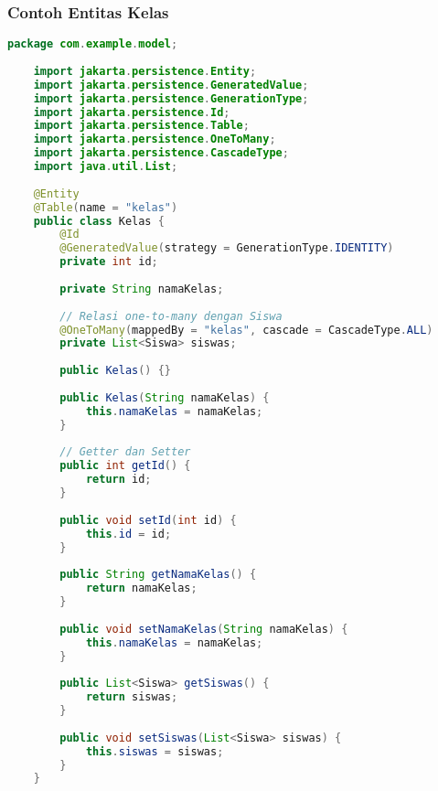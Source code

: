 \subsubsection*{Contoh Entitas Kelas}
\begin{lstlisting}[language=Java, style=JavaStyle]
	package com.example.model;
	
	import jakarta.persistence.Entity;
	import jakarta.persistence.GeneratedValue;
	import jakarta.persistence.GenerationType;
	import jakarta.persistence.Id;
	import jakarta.persistence.Table;
	import jakarta.persistence.OneToMany;
	import jakarta.persistence.CascadeType;
	import java.util.List;
	
	@Entity
	@Table(name = "kelas")
	public class Kelas {
		@Id
		@GeneratedValue(strategy = GenerationType.IDENTITY)
		private int id;
		
		private String namaKelas;
		
		// Relasi one-to-many dengan Siswa
		@OneToMany(mappedBy = "kelas", cascade = CascadeType.ALL)
		private List<Siswa> siswas;
		
		public Kelas() {}
		
		public Kelas(String namaKelas) {
			this.namaKelas = namaKelas;
		}
		
		// Getter dan Setter
		public int getId() {
			return id;
		}
		
		public void setId(int id) {
			this.id = id;
		}
		
		public String getNamaKelas() {
			return namaKelas;
		}
		
		public void setNamaKelas(String namaKelas) {
			this.namaKelas = namaKelas;
		}
		
		public List<Siswa> getSiswas() {
			return siswas;
		}
		
		public void setSiswas(List<Siswa> siswas) {
			this.siswas = siswas;
		}
	}
\end{lstlisting}

